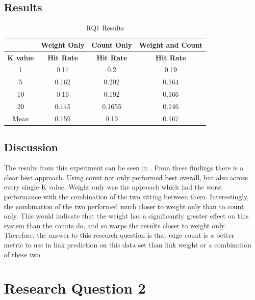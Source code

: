 \documentclass{l4proj}
\begin{document}
\subsection{Results}

\begin{table}[h]
    \centering
    \caption{RQ1 Results}
    \label{tab:rq1_results}
    \begin{tabular}{|c|c|c|c|}
    \hline
    & \textbf{Weight Only} & \textbf{Count Only} &\textbf{Weight and Count} \\ \hline
    \textbf{K value} & \textbf{Hit Rate} & \textbf{Hit Rate} & \textbf{Hit Rate}\\ \hline
    1 & 0.17 & 0.2 & 0.19 \\ \hline
    5 & 0.162 & 0.202 & 0.164\\ \hline
    10 & 0.16 & 0.192 & 0.166 \\ \hline
    20 & 0.145 &0.1655 & 0.146\\ \hline
    Mean & 0.159 & 0.19 & 0.167 \\ \hline
    \end{tabular}
\end{table}

\subsection{Discussion}

The results from this experiment can be seen in . From these findings there is a clear best approach. Using count not only performed best overall, but also across every single K value. Weight only was the approach which had the worst performance with the combination of the two sitting between them. Interestingly, the combination of the two performed much closer to weight only than to count only. This would indicate that the weight has a significantly greater effect on this system than the counts do, and so warps the results closer to weight only. \\ 

Therefore, the answer to this research question is that edge count is a better metric to use in link prediction on this data set than link weight or a combination of these two. \\

\section{Research Question 2}
\end{document}
